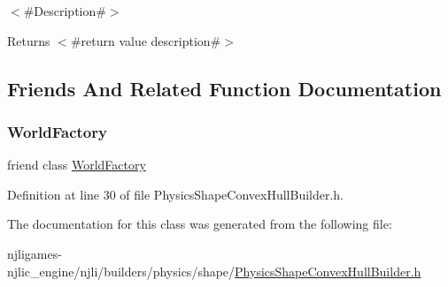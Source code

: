 $<$\#\+Description\#$>$

\begin{DoxyReturn}{Returns}
$<$\#return value description\#$>$ 
\end{DoxyReturn}


\subsection{Friends And Related Function Documentation}
\mbox{\label{classnjli_1_1_physics_shape_convex_hull_builder_acb96ebb09abe8f2a37a915a842babfac}} 
\subsubsection{\texorpdfstring{World\+Factory}{WorldFactory}}
{\footnotesize\ttfamily friend class \mbox{\hyperlink{classnjli_1_1_world_factory}{World\+Factory}}\hspace{0.3cm}{\ttfamily [friend]}}



Definition at line 30 of file Physics\+Shape\+Convex\+Hull\+Builder.\+h.



The documentation for this class was generated from the following file\+:\begin{DoxyCompactItemize}
\item 
njligames-\/njlic\+\_\+engine/njli/builders/physics/shape/\mbox{\hyperlink{_physics_shape_convex_hull_builder_8h}{Physics\+Shape\+Convex\+Hull\+Builder.\+h}}\end{DoxyCompactItemize}
